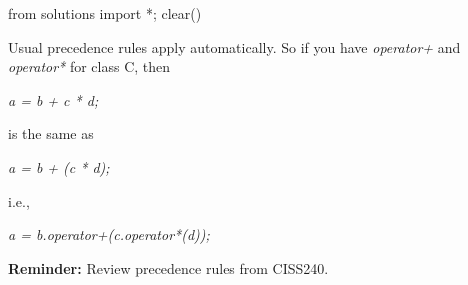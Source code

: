 \begin{python0}
from solutions import *; clear()
\end{python0}

Usual precedence rules apply automatically. So if you have
\textit{operator+} and \textit{operator*} for class C, then

\textit{a = b + c * d;}

is the same as

\textit{a = b + (c * d);}

i.e.,

\textit{a = b.operator+(c.operator*(d));}

\textbf{Reminder:} Review precedence rules from CISS240.


